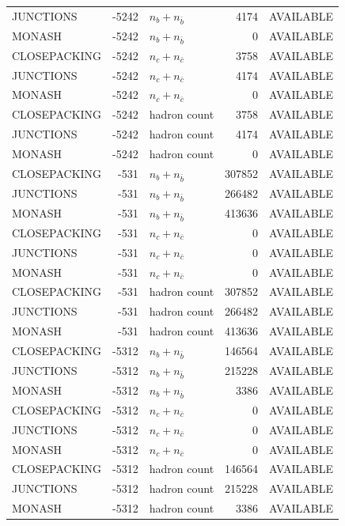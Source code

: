\begin{landscape}
\begin{longtable}{@{}lrlrl@{}}
JUNCTIONS & -5242 & $n_b+n_{\bar b}$ & \num{4174} & AVAILABLE \\
MONASH & -5242 & $n_b+n_{\bar b}$ & \num{0} & AVAILABLE \\
CLOSEPACKING & -5242 & $n_c+n_{\bar c}$ & \num{3758} & AVAILABLE \\
JUNCTIONS & -5242 & $n_c+n_{\bar c}$ & \num{4174} & AVAILABLE \\
MONASH & -5242 & $n_c+n_{\bar c}$ & \num{0} & AVAILABLE \\
CLOSEPACKING & -5242 & hadron count & \num{3758} & AVAILABLE \\
JUNCTIONS & -5242 & hadron count & \num{4174} & AVAILABLE \\
MONASH & -5242 & hadron count & \num{0} & AVAILABLE \\
CLOSEPACKING & -531 & $n_b+n_{\bar b}$ & \num{307852} & AVAILABLE \\
JUNCTIONS & -531 & $n_b+n_{\bar b}$ & \num{266482} & AVAILABLE \\
MONASH & -531 & $n_b+n_{\bar b}$ & \num{413636} & AVAILABLE \\
CLOSEPACKING & -531 & $n_c+n_{\bar c}$ & \num{0} & AVAILABLE \\
JUNCTIONS & -531 & $n_c+n_{\bar c}$ & \num{0} & AVAILABLE \\
MONASH & -531 & $n_c+n_{\bar c}$ & \num{0} & AVAILABLE \\
CLOSEPACKING & -531 & hadron count & \num{307852} & AVAILABLE \\
JUNCTIONS & -531 & hadron count & \num{266482} & AVAILABLE \\
MONASH & -531 & hadron count & \num{413636} & AVAILABLE \\
CLOSEPACKING & -5312 & $n_b+n_{\bar b}$ & \num{146564} & AVAILABLE \\
JUNCTIONS & -5312 & $n_b+n_{\bar b}$ & \num{215228} & AVAILABLE \\
MONASH & -5312 & $n_b+n_{\bar b}$ & \num{3386} & AVAILABLE \\
CLOSEPACKING & -5312 & $n_c+n_{\bar c}$ & \num{0} & AVAILABLE \\
JUNCTIONS & -5312 & $n_c+n_{\bar c}$ & \num{0} & AVAILABLE \\
MONASH & -5312 & $n_c+n_{\bar c}$ & \num{0} & AVAILABLE \\
CLOSEPACKING & -5312 & hadron count & \num{146564} & AVAILABLE \\
JUNCTIONS & -5312 & hadron count & \num{215228} & AVAILABLE \\
MONASH & -5312 & hadron count & \num{3386} & AVAILABLE \\

\end{longtable}
\end{landscape}
